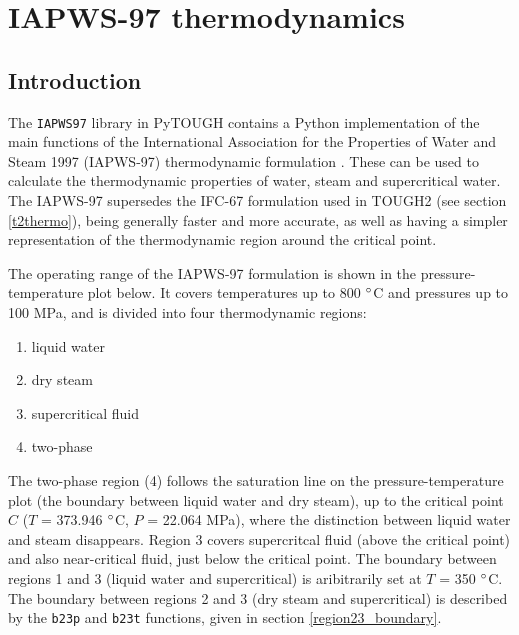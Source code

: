 \chapter{IAPWS-97 thermodynamics}
\label{iapws97}

\section{Introduction}
The \texttt{IAPWS97} library in PyTOUGH contains a Python implementation of the main functions of the International Association for the Properties of Water and Steam 1997 (IAPWS-97) thermodynamic formulation \citep{iapws_2000}.  These can be used to calculate the thermodynamic properties of water, steam and supercritical water.  The IAPWS-97 supersedes the IFC-67 formulation used in TOUGH2 (see section \ref{t2thermo}), being generally faster and more accurate, as well as having a simpler representation of the thermodynamic region around the critical point.

The operating range of the IAPWS-97 formulation is shown in the pressure-temperature plot below.  It covers temperatures up to 800 $\degree$C and pressures up to 100 MPa, and is divided into four thermodynamic regions:

\begin{enumerate}
  \item liquid water
  \item dry steam
  \item supercritical fluid
  \item two-phase
\end{enumerate}

The two-phase region (4) follows the saturation line on the pressure-temperature plot (the boundary between liquid water and dry steam), up to the critical point $C$ ($T$ = 373.946 $\degree$C, $P$ = 22.064 MPa), where the distinction between liquid water and steam disappears.  Region 3 covers supercritcal fluid (above the critical point) and also near-critical fluid, just below the critical point.  The boundary between regions 1 and 3 (liquid water and supercritical) is aribitrarily set at $T$ = 350 $\degree$C.  The boundary between regions 2 and 3 (dry steam and supercritical) is described by the \texttt{b23p} and \texttt{b23t} functions, given in section \ref{region23_boundary}.

